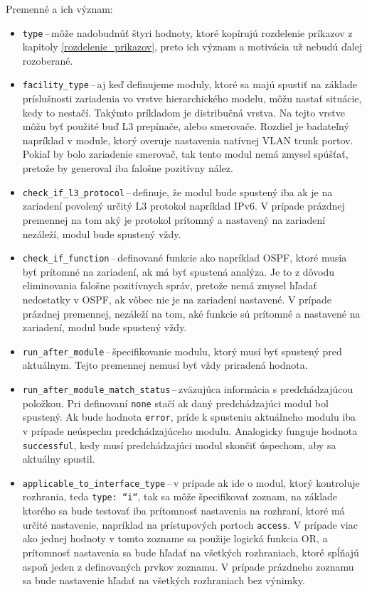 \vspace{1em}
\noindent
Premenné a ich význam:
\begin{itemize}
	\item \texttt{type}\,--\,môže nadobudnúť štyri hodnoty, ktoré kopírujú rozdelenie príkazov z kapitoly \ref{rozdelenie_prikazov}, preto ich význam a motivácia už nebudú ďalej rozoberané.
	\item \texttt{facility\_type}\,--\,aj keď definujeme moduly, ktoré sa majú spustiť na základe príslušnosti zariadenia vo vrstve hierarchického modelu, môžu nastať situácie, kedy to nestačí. Takýmto príkladom je distribučná vrstva. Na tejto vrstve môžu byť použité buď L3 prepínače, alebo smerovače. Rozdiel je badateľný napríklad v module, ktorý overuje nastavenia natívnej VLAN trunk portov. Pokiaľ by bolo zariadenie smerovač, tak tento modul nemá zmysel spúšťať, pretože by generoval iba falošne pozitívny nález.
	\item \texttt{check\_if\_l3\_protocol}\,--\,definuje, že modul bude spustený iba ak je na zariadení povolený určitý L3 protokol napríklad IPv6. V prípade prázdnej premennej na tom aký je protokol prítomný a nastavený na zariadení nezáleží, modul bude spustený vždy.
	\item \texttt{check\_if\_function}\,--\,definované funkcie ako napríklad OSPF, ktoré musia byť prítomné na zariadení, ak má byť spustená analýza. Je to z dôvodu eliminovania falošne pozitívnych správ, pretože nemá zmysel hľadať nedostatky v OSPF, ak vôbec nie je na zariadení nastavené. V prípade prázdnej premennej, nezáleží na tom, aké funkcie sú prítomné a nastavené na zariadení, modul bude spustený vždy.
	\item \texttt{run\_after\_module}\,--\,špecifikovanie modulu, ktorý musí byť spustený pred aktuálnym. Tejto premennej nemusí byť vždy priradená hodnota.
	\item \texttt{run\_after\_module\_match\_status}\,--\,zväzujúca informácia s predchádzajúcou položkou. Pri definovaní \texttt{none} stačí ak daný predchádzajúci modul bol spustený. Ak bude hodnota \texttt{error}, príde k spusteniu aktuálneho modulu iba v prípade neúspechu predchádzajúceho modulu. Analogicky funguje hodnota \texttt{successful}, kedy musí predchádzajúci modul skončiť úspechom, aby sa aktuálny spustil.
	\item \texttt{applicable\_to\_interface\_type}\,--\,v prípade ak ide o modul, ktorý kontroluje rozhrania, teda \texttt{type: ``i``}, tak sa môže špecifikovať zoznam, na základe ktorého sa bude testovať iba prítomnosť nastavenia na rozhraní, ktoré má určité nastavenie, napríklad na prístupových portoch \texttt{access}. V prípade viac ako jednej hodnoty v tomto zozname sa použije logická funkcia OR, a prítomnosť nastavenia sa bude hľadať na všetkých rozhraniach, ktoré spĺňajú aspoň jeden z definovaných prvkov zoznamu. V prípade prázdneho zoznamu sa bude nastavenie hľadať na všetkých rozhraniach bez výnimky.

\end{itemize}
